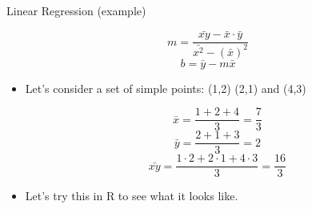 \documentclass[9pt,xcolor=pdftex,dvipsnames,table]{beamer}
\begin{document}
\subsection{}
\begin{frame}{Linear Regression (example)}
    
	    \begin{equation*} m = \frac{\bar{xy} - \bar{x} \cdot \bar{y}}{\bar{x^2} - (\bar{x})^2}\end{equation*}
    	\vspace{.5cm}
         \begin{equation*} b = \bar{y} - m\bar{x}\end{equation*}
         
	\begin{itemize}
		\item Let's consider a set of simple points: (1,2) (2,1) and (4,3)

	\begin{equation*} \bar{x} = \frac{1 + 2 + 4}{3} = \frac{7}{3}\end{equation*}
	\begin{equation*} \bar{y} = \frac{2 + 1 + 3}{3} = 2\end{equation*}
		\begin{equation*} \bar{xy} = \frac{1 \cdot 2 + 2 \cdot 1 + 4 \cdot 3}{3} = \frac{16}{3}\end{equation*}
		
		\vspace{.5cm}
		
		\item Let's try this in R to see what it looks like.
	\end{itemize}

\end{frame}
\end{document}
